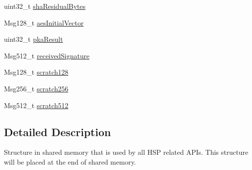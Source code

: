 \begin{DoxyCompactItemize}
\item 
uint32\-\_\-t \hyperlink{structHwapi__Shared_a592f7a59a8c6a27526d868bc6a379ee0}{sha\-Residual\-Bytes}
\item 
Msg128\-\_\-t \hyperlink{structHwapi__Shared_a6fffb479f4b0d7a499df1ae2db1260c9}{aes\-Initial\-Vector}
\item 
uint32\-\_\-t \hyperlink{structHwapi__Shared_a7091376acf43318e1bbfe927d8797280}{pka\-Result}
\item 
Msg512\-\_\-t \hyperlink{structHwapi__Shared_a5a0ab22ff83cfa5068205541ba53f9a5}{received\-Signature}
\item 
Msg128\-\_\-t \hyperlink{structHwapi__Shared_ae80da535be9e6646c842093311f11e2c}{scratch128}
\item 
Msg256\-\_\-t \hyperlink{structHwapi__Shared_a55737bd4edbd0b34d22bde76ad93026d}{scratch256}
\item 
Msg512\-\_\-t \hyperlink{structHwapi__Shared_a707b025b939b5943f26ee242f75e427f}{scratch512}
\end{DoxyCompactItemize}


\subsection{Detailed Description}
Structure in shared memory that is used by all H\-S\-P related A\-P\-Is. This structure will be placed at the end of shared memory. 

